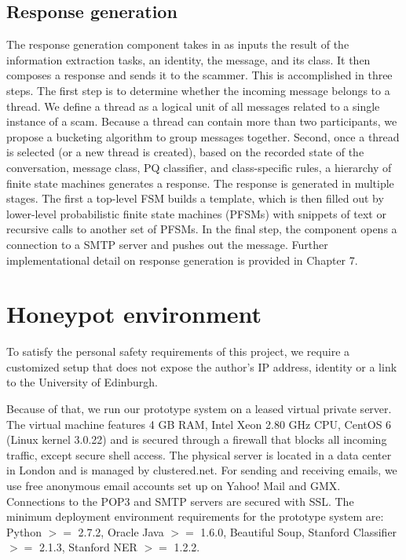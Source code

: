 \subsection*{Response generation}
The response generation component takes in as inputs the result of the information extraction tasks, an identity, the message, and its class. It then composes a response and sends it to the scammer. This is accomplished in three steps. The first step is to determine whether the incoming message belongs to a thread. We define a thread as a logical unit of all messages related to a single instance of a scam. Because a thread can contain more than two participants, we propose a bucketing algorithm to group messages together. Second, once a thread is selected (or a new thread is created), based on the recorded state of the conversation, message class, PQ classifier, and class-specific rules, a hierarchy of finite state machines generates a response. The response is generated in multiple stages. The first a top-level FSM builds a template, which is then filled out by lower-level probabilistic finite state machines (PFSMs) with snippets of text or recursive calls to another set of PFSMs. In the final step, the component opens a connection to a SMTP server and pushes out the message. Further implementational detail on response generation is provided in Chapter 7.

\section{Honeypot environment}

To satisfy the personal safety requirements of this project, we require a customized setup that does not expose the author's IP address, identity or a link to the University of Edinburgh.

Because of that, we run our prototype system on a leased virtual private server. The virtual machine features 4 GB RAM, Intel Xeon 2.80 GHz CPU, CentOS 6 (Linux kernel 3.0.22) and is secured through a firewall that blocks all incoming traffic, except secure shell access. The physical server is located in a data center in London and is managed by clustered.net. For sending and receiving emails, we use free anonymous email accounts set up on Yahoo! Mail and GMX. Connections to the POP3 and SMTP servers are secured with SSL. The minimum deployment environment requirements for the prototype system are: Python $>=$ 2.7.2, Oracle Java $>=$ 1.6.0, Beautiful Soup, Stanford Classifier $>=$ 2.1.3, Stanford NER $>=$ 1.2.2. 
